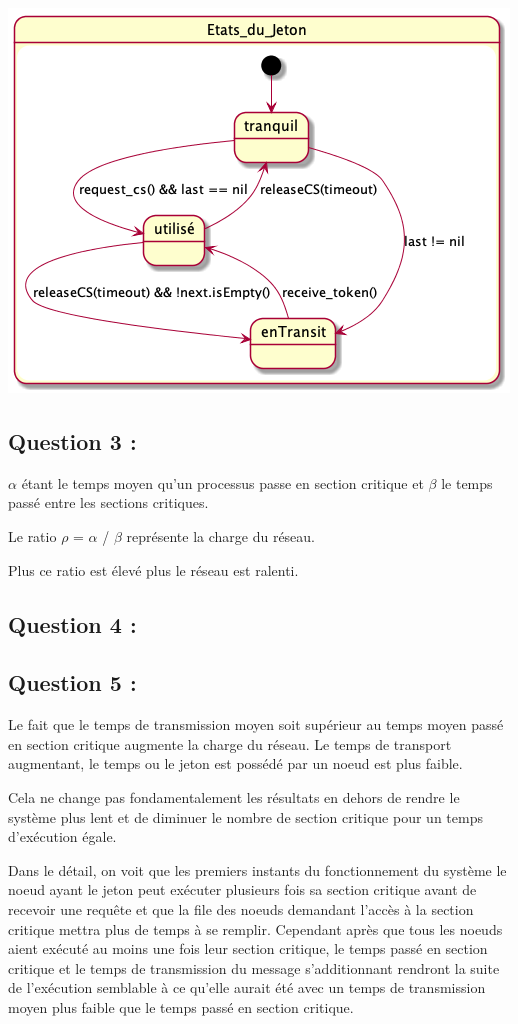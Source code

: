 \documentclass[11pt,a4paper]{report}
\begin{document}
\includegraphics[scale=0.3]{../Diagrammes/exercice_1-question_2.png}


\section{Question 3 :}

$\alpha$ étant le temps moyen qu'un processus passe en section critique et $\beta$ le temps passé entre les sections critiques.

Le ratio $\rho$ = $\alpha$ / $\beta$ représente la charge du réseau.

Plus ce ratio est élevé plus le réseau est ralenti.

\section{Question 4 :}

\section{Question 5 :}

Le fait que le temps de transmission moyen soit supérieur au temps moyen passé en section critique augmente la charge du réseau. Le temps de transport augmentant, le temps ou le jeton est possédé par un noeud est plus faible.

Cela ne change pas fondamentalement les résultats en dehors de rendre le système plus lent et de diminuer le nombre de section critique pour un temps d'exécution égale.

Dans le détail, on voit que les premiers instants du fonctionnement du système le noeud ayant le jeton peut exécuter plusieurs fois sa section critique avant de recevoir une requête et que la file des noeuds demandant l'accès à la section critique mettra plus de temps à se remplir. Cependant après que tous les noeuds aient exécuté au moins une fois leur section critique, le temps passé en section critique et le temps de transmission du message s'additionnant rendront la suite de l'exécution semblable à ce qu'elle aurait été avec un temps de transmission moyen plus faible que le temps passé en section critique.


\chapter{}


\chapter{}
\end{document}
